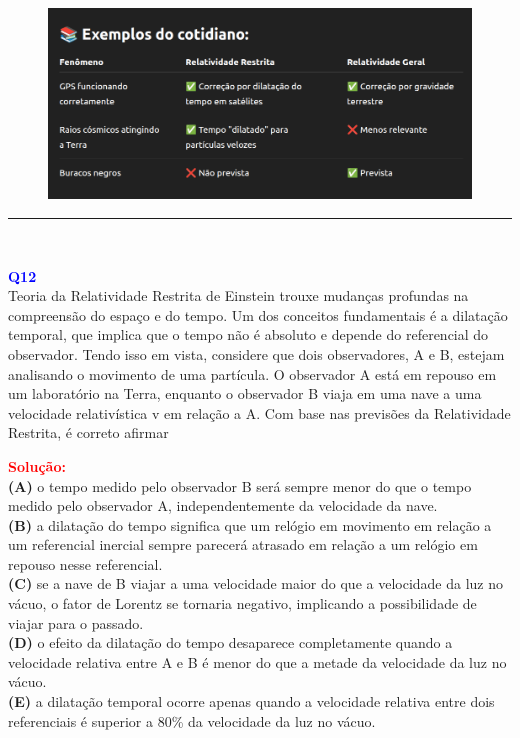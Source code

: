 \documentclass[a4paper,12pt]{article}
\begin{document}
\begin{center}
\begin{figure}[h!]
    \centering
    \includegraphics[width=1\textwidth]{figures/teoria_relatividade_1.png}
\end{figure}
\end{center}

\noindent\rule{\linewidth}{0.6pt}\\

\newpage
\begin{flushleft}
\textbf{\textcolor{blue}{\Large Q12}}\\
\colorbox{yellow!50}{Teoria da Relatividade Restrita de Einstein} trouxe mudanças profundas na compreensão
do espaço e do tempo. Um dos conceitos fundamentais é a dilatação temporal, que implica
que o tempo não é absoluto e depende do referencial do observador. Tendo isso em vista, considere que dois
observadores, A e B, estejam analisando o movimento de uma partícula. O observador A está em repouso em um 
laboratório na Terra, enquanto o observador B viaja em uma nave a uma velocidade relativística v em relação
 a A. Com base nas previsões da Relatividade Restrita, é correto afirmar 

\textcolor{red}{\textbf{Solução:}}\\

\textbf{(A)} o tempo medido pelo observador B será sempre
menor do que o tempo medido pelo observador
A, independentemente da velocidade da nave.\\
\colorbox{green!50}{\textbf{(B)}} a dilatação do tempo significa que um relógio em
movimento em relação a um referencial inercial
sempre parecerá atrasado em relação a um
relógio em repouso nesse referencial.\\
\textbf{(C)} se a nave de B viajar a uma velocidade maior do
que a velocidade da luz no vácuo, o fator de
Lorentz se tornaria negativo, implicando a
possibilidade de viajar para o passado.\\
\textbf{(D)} o efeito da dilatação do tempo desaparece
completamente quando a velocidade relativa
entre A e B é menor do que a metade da
velocidade da luz no vácuo.\\
\textbf{(E)} a dilatação temporal ocorre apenas quando a
velocidade relativa entre dois referenciais é
superior a 80\% da velocidade da luz no vácuo.

\end{flushleft}
\end{document}
